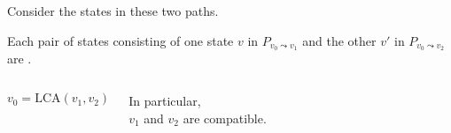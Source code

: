 \begin{frame}{}
  \centerline{ Consider the states in these two paths.}

  \begin{lemma}
    Each pair of states consisting of one state $v$ in $P_{v_0 \leadsto v_1}$ and the other $v'$ in $P_{v_0 \leadsto v_2}$ are .
  \end{lemma}

  \begin{columns}
	\[
	  v_0 = \text{LCA}(v_1, v_2)
	\]

	\vspace{0.50cm}
	\begin{center}
	  {In particular, \\ $v_1$ and $v_2$ are compatible.}
	\end{center}
  \end{columns}
\end{frame}

